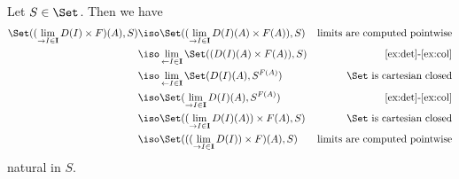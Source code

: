 \begin{answer}
\begin{enumerate}
    Let $S\in\Set$. Then we have
    \begin{align*}
      \Set((\lim_{\to I\in\mathbf I} D(I)\times F)(A), S)&\iso \Set((\lim_{\to I\in\mathbf I} D(I)(A)\times F(A)), S)&\text{limits are computed pointwise}\\
      &\iso \lim_{\leftarrow I\in\mathbf I} \Set((D(I)(A)\times F(A)), S)&\text{\ref{ex:det}-\ref{ex:col}}\\
      &\iso \lim_{\leftarrow I\in\mathbf I} \Set(D(I)(A), S^{F(A)})&\Set \text{ is cartesian closed}\\
      &\iso \Set(\lim_{\to I\in\mathbf I} D(I)(A), S^{F(A)})&\text{\ref{ex:det}-\ref{ex:col}}\\
      &\iso \Set((\lim_{\to I\in\mathbf I} D(I)(A))\times F(A), S)&\Set \text{ is cartesian closed}\\
      &\iso \Set(((\lim_{\to I\in\mathbf I} D(I))\times F)(A), S)&\text{limits are computed pointwise}
    \end{align*}
    natural in $S$.
  \end{enumerate}
\end{answer}


